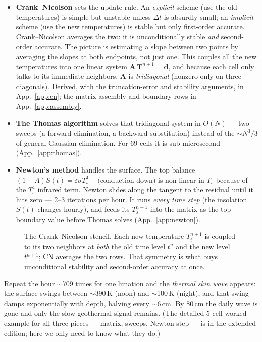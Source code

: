 \documentclass[11pt]{report}
\begin{document}
\begin{itemize}[leftmargin=1.4em,itemsep=3pt]
\item \textbf{Crank--Nicolson} sets the update rule. An \emph{explicit} scheme
  (use the old temperatures) is simple but unstable unless $\Delta t$ is
  absurdly small; an \emph{implicit} scheme (use the new temperatures) is stable
  but only first-order accurate. Crank--Nicolson averages the two: it is
  unconditionally stable \emph{and} second-order accurate. The picture is
  estimating a slope between two points by averaging the slopes at both
  endpoints, not just one. This couples all the new temperatures into one linear
  system $\mathbf{A}\,\mathbf{T}^{n+1}=\mathbf{d}$, and because each cell only
  talks to its immediate neighbors, $\mathbf{A}$ is \emph{tridiagonal} (nonzero
  only on three diagonals). Derived, with the truncation-error and stability
  arguments, in App.~\ref{app:cn}; the matrix assembly and boundary rows in
  App.~\ref{app:assembly}.
\item \textbf{The Thomas algorithm} solves that tridiagonal system in $O(N)$
  --- two sweeps (a forward elimination, a backward substitution) instead of the
  $\sim N^3/3$ of general Gaussian elimination. For 69 cells it is
  sub-microsecond (App.~\ref{app:thomas}).
\item \textbf{Newton's method} handles the surface. The top balance
  $(1-A)S(t)=\varepsilon\sigma T_s^4 + \text{(conduction down)}$ is non-linear in
  $T_s$ because of the $T_s^4$ infrared term. Newton slides along the tangent to
  the residual until it hits zero --- 2--3 iterations per hour. It runs
  \emph{every time step} (the insolation $S(t)$ changes hourly), and feeds its
  $T_s^{n+1}$ into the matrix as the top boundary value before Thomas solves
  (App.~\ref{app:newton}).
\end{itemize}

\begin{figure}[htbp]\centering

\caption{The Crank--Nicolson stencil. Each new temperature $T_i^{n+1}$ is coupled
to its two neighbors at \emph{both} the old time level $t^n$ and the new level
$t^{n+1}$; CN averages the two rows. That symmetry is what buys unconditional
stability and second-order accuracy at once.}
\label{fig:cnstencil}
\end{figure}

\noindent Repeat the hour $\sim$709 times for one lunation and the \emph{thermal
skin wave} appears: the surface swings between $\sim$390\,K (noon) and
$\sim$100\,K (night), and that swing damps exponentially with depth, halving
every $\sim$6\,cm. By 80\,cm the daily wave is gone and only the slow geothermal
signal remains. (The detailed 5-cell worked example for all three pieces ---
matrix, sweeps, Newton step --- is in the extended edition; here we only need to
know what they do.)
\end{document}
